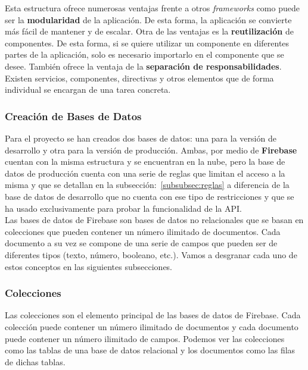 Esta estructura ofrece numerosas ventajas frente a otros \textit{frameworks} como puede ser la \textbf{modularidad} de la aplicación. De esta forma,
la aplicación se convierte más fácil de mantener y de escalar. Otra de las ventajas es la \textbf{reutilización} de componentes. De esta forma, si
se quiere utilizar un componente en diferentes partes de la aplicación, solo es necesario importarlo en el componente que se desee. También
ofrece la ventaja de la \textbf{separación de responsabilidades}. Existen servicios, componentes, directivas y otros elementos
que de forma individual se encargan de una tarea concreta.

\subsubsection{Creación de Bases de Datos}\label{subsec:creacion-de-bases-de-datos}

Para el proyecto se han creados dos bases de datos: una para la versión de desarrollo y otra para la versión de producción.
Ambas, por medio de \textbf{Firebase} cuentan con la misma estructura y se encuentran en la nube, pero la base de datos de
producción cuenta con una serie de reglas que limitan el acceso a la misma y que se detallan en la subsección:~\ref{subsubsec:reglas} a
diferencia de la base de datos de desarrollo que no cuenta con ese tipo de restricciones y que se ha usado exclusivamente para
probar la funcionalidad de la API. \\

Las bases de datos de Firebase son bases de datos no relacionales que se basan en colecciones que pueden contener un número ilimitado de documentos.
Cada documento a su vez se compone de una serie de campos que pueden ser de diferentes tipos (texto, número, booleano, etc.).
Vamos a desgranar cada uno de estos conceptos en las siguientes subsecciones.

\newpage

\subsubsection{Colecciones}\label{subsubsec:colecciones}

Las colecciones son el elemento principal de las bases de datos de Firebase. Cada colección puede contener un número ilimitado de documentos
y cada documento puede contener un número ilimitado de campos. Podemos ver las colecciones como las tablas de una base de datos relacional
y los documentos como las filas de dichas tablas. \\

